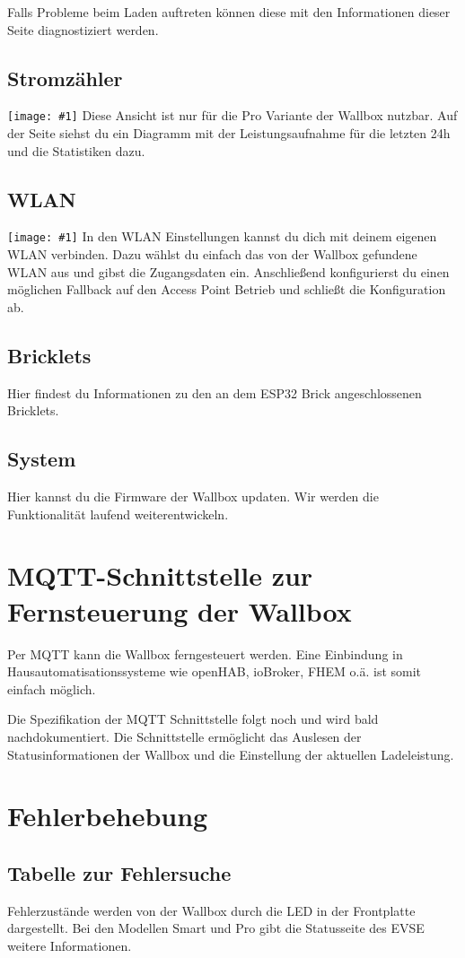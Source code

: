 \documentclass[a4paper,10pt]{article}
\newcommand{\gfx}[1]{\texttt{[image: \#1]}}
\begin{document}
\begin{multicols*}{2}
	Falls Probleme beim Laden auftreten können diese mit den Informationen dieser 
	Seite diagnostiziert werden.

	\subsection{Stromzähler}
	\gfx{./img/resized/web_counter}
	Diese Ansicht ist nur für die Pro Variante der Wallbox nutzbar. Auf der Seite
	siehst du ein Diagramm mit der Leistungsaufnahme für die letzten 24h und die
	Statistiken dazu.

	\subsection{WLAN}
	\gfx{./img/resized/web_wifi}
	In den WLAN Einstellungen kannst du dich mit deinem eigenen WLAN verbinden. Dazu
	wählst du einfach das von der Wallbox gefundene WLAN aus und gibst die
	Zugangsdaten ein. Anschließend konfigurierst du einen möglichen Fallback auf
	den Access Point Betrieb und schließt die Konfiguration ab.
	
	\subsection{Bricklets}
	Hier findest du Informationen zu den an dem ESP32 Brick angeschlossenen
	Bricklets.

	\subsection{System}
	Hier kannst du die Firmware der Wallbox updaten. Wir werden die Funktionalität
	laufend weiterentwickeln.

	\section{MQTT-Schnittstelle zur Fernsteuerung der Wallbox}
	Per MQTT kann die Wallbox ferngesteuert werden. Eine Einbindung in
	Hausautomatisationssysteme wie openHAB, ioBroker, FHEM o.ä. ist somit einfach
	möglich.

	Die Spezifikation der MQTT Schnittstelle folgt noch und wird bald
	nachdokumentiert. Die Schnittstelle ermöglicht das Auslesen der
	Statusinformationen der Wallbox und die Einstellung der aktuellen Ladeleistung.
	\newpage \section{Fehlerbehebung}\label{fehlerbehebung} \subsection{Tabelle zur Fehlersuche}
	Fehlerzustände werden von der Wallbox durch die LED in der Frontplatte
	dargestellt. Bei den Modellen Smart und Pro gibt die Statusseite des EVSE
	weitere Informationen.


\end{multicols*}
\end{document}
